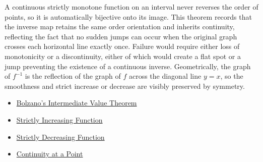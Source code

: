 \begin{remark*}[Interpretation]
A continuous strictly monotone function on an interval never reverses the order of points, so it is automatically bijective onto its image. This theorem records that the inverse map retains the same order orientation and inherits continuity, reflecting the fact that no sudden jumps can occur when the original graph crosses each horizontal line exactly once. Failure would require either loss of monotonicity or a discontinuity, either of which would create a flat spot or a jump preventing the existence of a continuous inverse. Geometrically, the graph of $f^{-1}$ is the reflection of the graph of $f$ across the diagonal line $y=x$, so the smoothness and strict increase or decrease are visibly preserved by symmetry.
\end{remark*}

\begin{dependencies}
\begin{itemize}
  \item \hyperref[thm:bolzano-intermediate-value]{Bolzano's Intermediate Value Theorem}
  \item \hyperref[def:function-strictly-increasing]{Strictly Increasing Function}
  \item \hyperref[def:function-strictly-decreasing]{Strictly Decreasing Function}
  \item \hyperref[def:continuous-at-point]{Continuity at a Point}
\end{itemize}
\end{dependencies}
